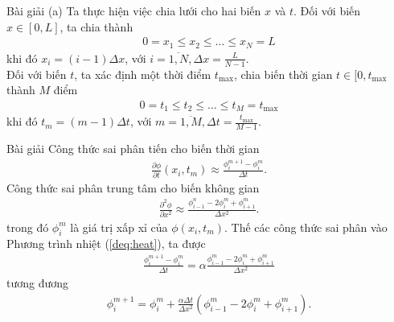 \documentclass[9pt]{beamer}
\numberwithin{equation}{section}
\begin{document}
\begin{frame}
\begin{exampleblock}{Bài giải}
    (a) Ta thực hiện việc chia lưới cho hai biến $x$ và $t$. Đối với biến $x \in [0,L]$, ta chia thành
    \begin{align*}
        0 = x_1 \le x_2 \le \ldots \le x_N = L
    \end{align*}
    khi đó $x_i = (i-1) \Delta x$, với $i = \overline{1,N}, \Delta x = \frac{L}{N-1}$. \\

    Đối với biến $t$, ta xác định một thời điểm $t_{\max}$, chia biến thời gian $t \in [0, t_{\max}$ thành $M$ điểm
    \begin{align*}
        0 = t_1 \le t_2 \le \ldots \le t_M = t_{\max}
    \end{align*}
    khi đó $t_m = (m-1) \Delta t$, với $m = \overline{1,M}, \Delta t = \frac{t_{\max}}{M-1}$.
\end{exampleblock}
\end{frame}

\begin{frame}
\begin{exampleblock}{Bài giải}
    Công thức sai phân tiến cho biến thời gian
    \begin{align*}
        \frac{\partial \phi}{\partial t}(x_i, t_m)
        \approx \frac{\phi_i^{m+1} - \phi_i^m}{\Delta t}.
    \end{align*}
    Công thức sai phân trung tâm cho biến không gian
    \begin{align*}
        \frac{\partial^2 \phi}{\partial x^2}
        \approx \frac{\phi_{i-1}^n - 2\phi_i^m + \phi_{i+1}^m}{\Delta x^2}.
    \end{align*}
    trong đó $\phi_i^m$ là giá trị xấp xỉ của $\phi(x_i, t_m)$. Thế các công thức sai phân vào Phương trình nhiệt (\ref{deq:heat}), ta được
    \begin{align*}
        \frac{\phi_i^{m+1} - \phi_i^m}{\Delta t} =
        \alpha \frac{\phi_{i-1}^m - 2\phi_i^m + \phi_{i+1}^m}{\Delta x^2}
    \end{align*}
    tương đương
    \begin{align*}
        \phi_i^{m+1} = \phi_i^m + \frac{\alpha \Delta t}{\Delta x^2} \left(\phi_{i-1}^m - 2\phi_i^m + \phi_{i+1}^m\right).
    \end{align*}
\end{exampleblock}
\end{frame}
\end{document}

